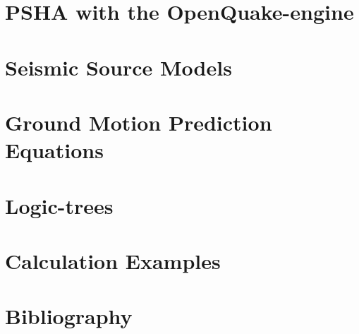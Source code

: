 \documentclass[11pt,fleqn]{book} %
\begin{document}
\chapter{PSHA with the OpenQuake-engine}
\label{chap:calculators}


\chapter{Seismic Source Models}
\label{chap:ssm}


\chapter{Ground Motion Prediction Equations}
\label{chap:gmpes}


\chapter{Logic-trees}


\chapter{Calculation Examples}



\chapter{Bibliography}
\end{document}
